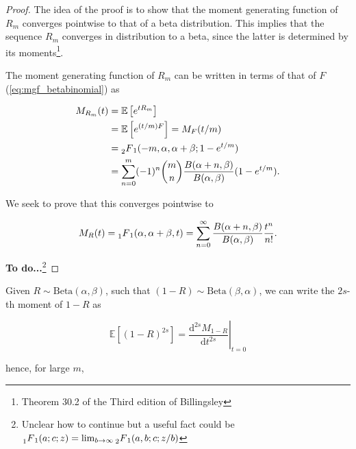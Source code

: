 \documentclass[american, abstract=on]{scrartcl}
\theoremstyle{plain}
\newcommand{\E}{\mathbb{E}}
\newcommand{\Beta}{\text{Beta}}
\begin{document}
\begin{proof}

    The idea of the proof is to show that the moment generating function of $R_m$ converges pointwise to that of a beta distribution. This implies that the sequence $R_m$ converges in distribution to a beta, since the latter is determined by its moments\footnote{Theorem 30.2 of the Third edition of Billingsley}.

    The moment generating function of $R_m$ can be written in terms of that of $F$ (\ref{eq:mgf_betabinomial}) as 

    \begin{equation}
        \begin{split}
            M_{R_m}(t) &= \E\left[e^{t R_m}\right] \\ 
            &= \E\left[e^{(t / m) F}\right] = M_F(t / m) \\
            &= \prescript{}{2}{F}_1(-m, \alpha, \alpha + \beta; 1 - e^{t / m}) \\
            &= \sum^m_{n = 0} (-1)^n \binom{m}{n} \frac{B(\alpha + n, \beta)}{B(\alpha, \beta)} (1 - e^{t / m}).
        \end{split}
    \end{equation}

    We seek to prove that this converges pointwise to 

    \begin{equation}
        M_R(t) = \prescript{}{1}{F}_1(\alpha, \alpha + \beta, t)= \sum^{\infty}_{n = 0} \frac{B(\alpha + n, \beta)}{B(\alpha, \beta)} \frac{t^n}{n!}.
    \end{equation}

    
    \textbf{To do...}\footnote{Unclear how to continue but a useful fact could be $\prescript{}{1}{F}_1(a; c; z) = \lim_{b \rightarrow \infty} \prescript{}{2}{F}_1(a, b; c; z / b)$}

\end{proof}

Given $R \sim \Beta(\alpha, \beta)$, such that $(1 - R) \sim \Beta(\beta, \alpha)$, we can write the $2s$-th moment of $1 - R$ as 

\begin{equation}
    \E[(1 - R)^{2s}] =  \left.\frac{\text{d}^{2s} M_{1 - R}}{\text{d}t^{2s}}\right\rvert_{t = 0} 
\end{equation}

hence, for large $m$,
\end{document}
